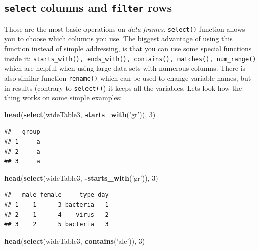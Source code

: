 \documentclass[]{book}
\newenvironment{Shaded}{\begin{snugshade}}{\end{snugshade}}
\newcommand{\KeywordTok}[1]{\textcolor[rgb]{0.13,0.29,0.53}{\textbf{#1}}}
\newcommand{\DecValTok}[1]{\textcolor[rgb]{0.00,0.00,0.81}{#1}}
\newcommand{\StringTok}[1]{\textcolor[rgb]{0.31,0.60,0.02}{#1}}
\newcommand{\OperatorTok}[1]{\textcolor[rgb]{0.81,0.36,0.00}{\textbf{#1}}}
\newcommand{\NormalTok}[1]{#1}
\theoremstyle{definition}
\theoremstyle{definition}
\theoremstyle{definition}
\theoremstyle{remark}
\begin{document}
\subsection{\texorpdfstring{\texttt{select} columns and \texttt{filter}
rows}{select columns and filter rows}}\label{select-columns-and-filter-rows}

Those are the most basic operations on \emph{data frames}.
\texttt{select()} function allows you to choose which columns you use.
The biggest advantage of using this function instead of simple
addressing, is that you can use some special functions inside it:
\texttt{starts\_with(),\ ends\_with(),\ contains(),\ matches(),\ num\_range()}
which are helpful when using large data sets with numerous columns.
There is also similar function \texttt{rename()} which can be used to
change variable names, but in results (contrary to \texttt{select()}) it
keeps all the variables. Lets look how the thing works on some simple
examples:

\begin{Shaded}
\begin{Highlighting}[]
\KeywordTok{head}\NormalTok{(}\KeywordTok{select}\NormalTok{(wideTable3, }\KeywordTok{starts_with}\NormalTok{(}\StringTok{'gr'}\NormalTok{)), }\DecValTok{3}\NormalTok{)}
\end{Highlighting}
\end{Shaded}

\begin{verbatim}
##   group
## 1     a
## 2     a
## 3     a
\end{verbatim}

\begin{Shaded}
\begin{Highlighting}[]
\KeywordTok{head}\NormalTok{(}\KeywordTok{select}\NormalTok{(wideTable3, }\OperatorTok{-}\KeywordTok{starts_with}\NormalTok{(}\StringTok{'gr'}\NormalTok{)), }\DecValTok{3}\NormalTok{)}
\end{Highlighting}
\end{Shaded}

\begin{verbatim}
##   male female     type day
## 1    1      3 bacteria   1
## 2    1      4    virus   2
## 3    2      5 bacteria   3
\end{verbatim}

\begin{Shaded}
\begin{Highlighting}[]
\KeywordTok{head}\NormalTok{(}\KeywordTok{select}\NormalTok{(wideTable3, }\KeywordTok{contains}\NormalTok{(}\StringTok{'ale'}\NormalTok{)), }\DecValTok{3}\NormalTok{)}
\end{Highlighting}
\end{Shaded}
\end{document}
